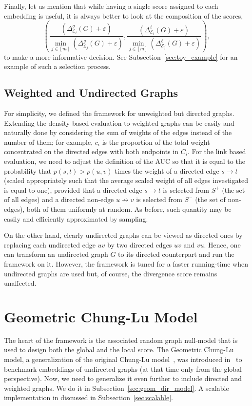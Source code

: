 \documentclass[11pt]{article}
\newcommand{\eps}{\varepsilon}
\newcommand{\emb}{\mathcal E}
\begin{document}
Finally, let us mention that while having a single score assigned to each embedding is useful, it is always better to look at the composition of the scores,
$$
\left( \frac { (\Delta^{g}_{\emb_i}(G) + \eps) } { \min_{j \in [m]} (\Delta^{g}_{\emb_j}(G) + \eps) }, \frac { (\Delta^{\ell}_{\emb_i}(G) + \eps) } {\min_{j \in [m]} (\Delta^{\ell}_{\emb_j}(G) + \eps) }  \right),
$$
to make a more informative decision. See Subsection~\ref{sec:toy_example} for an example of such a selection process. 

\subsection{Weighted and Undirected Graphs}\label{sec:framework4}

For simplicity, we defined the framework for unweighted but directed graphs. Extending the density based evaluation to weighted graphs can be easily and naturally done by considering the sum of weights of the edges instead of the number of them; for example, $c_i$ is the proportion of the total weight concentrated on the directed edges with both endpoints in $C_i$. For the link based evaluation, we need to adjust the definition of the AUC so that it is equal to the probability that $p(s,t) > p(u,v)$ times the weight of a directed edge $s \rightarrow t$ (scaled appropriately such that the average scaled weight of all edges investigated is equal to one), provided that a directed edge $s \rightarrow t$ is selected from $S^+$ (the set of all edges) and a directed non-edge $u \not\rightarrow v$ is selected from $S^-$ (the set of non-edges), both of them uniformly at random. As before, such quantity may be easily and efficiently approximated by sampling.

On the other hand, clearly undirected graphs can be viewed as directed ones by replacing each undirected edge $uv$ by two directed edges $uv$ and $vu$. Hence, one can transform an undirected graph $G$ to its directed counterpart and run the framework on it. However, the framework is tuned for a faster running-time when undirected graphs are used but, of course, the divergence score remains unaffected.

\section{Geometric Chung-Lu Model}\label{sec:chung-lu}

The heart of the framework is the associated random graph null-model that is used to design both the global and the local score. The Geometric Chung-Lu model, a generalization of the original Chung-Lu model~\cite{CL}, was introduced in~\cite{Embedding_Complex_Networks} to benchmark embeddings of undirected graphs (at that time only from the global perspective). Now, we need to generalize it even further to include directed and weighted graphs. We do it in Subsection~\ref{sec:geom_dir_model}. A scalable implementation in discussed in Subsection~\ref{sec:scalable}.
\end{document}
